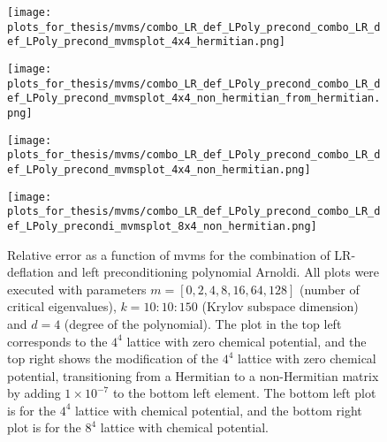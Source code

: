 \begin{figure}[H]
    \centering
    \begin{minipage}{0.45\textwidth}
        \centering
        \texttt{[image: plots\_for\_thesis/mvms/combo\_LR\_def\_LPoly\_precond\_combo\_LR\_def\_LPoly\_precond\_mvmsplot\_4x4\_hermitian.png]} %
    \end{minipage}%
    \hspace{0.02\textwidth} %
    \begin{minipage}{0.45\textwidth}
        \centering
        \texttt{[image: plots\_for\_thesis/mvms/combo\_LR\_def\_LPoly\_precond\_combo\_LR\_def\_LPoly\_precond\_mvmsplot\_4x4\_non\_hermitian\_from\_hermitian.png]} %
    \end{minipage}
    
    \vspace{0.02\textwidth} %
    
    \begin{minipage}{0.45\textwidth}
        \centering
        \texttt{[image: plots\_for\_thesis/mvms/combo\_LR\_def\_LPoly\_precond\_combo\_LR\_def\_LPoly\_precond\_mvmsplot\_4x4\_non\_hermitian.png]} %
    \end{minipage}%
    \hspace{0.02\textwidth} %
    \begin{minipage}{0.45\textwidth}
        \centering
        \texttt{[image: plots\_for\_thesis/mvms/combo\_LR\_def\_LPoly\_precond\_combo\_LR\_def\_LPoly\_precondi\_mvmsplot\_8x4\_non\_hermitian.png]} %
    \end{minipage}
    
    \caption{\small Relative error as a function of mvms for the combination of LR-deflation and left preconditioning polynomial Arnoldi. All plots were executed with parameters $m = [0, 2, 4, 8, 16, 64, 128]$ (number of critical eigenvalues), $k = 10:10:150$ (Krylov subspace dimension) and $d = 4$ (degree of the polynomial). The plot in the top left corresponds to the $4^4$ lattice with zero chemical potential, and the top right shows the modification of the $4^4$ lattice with zero chemical potential, transitioning from a Hermitian to a non-Hermitian matrix by adding $1 \times 10^{-7}$ to the bottom left element. The bottom left plot is for the $4^4$ lattice with chemical potential, and the bottom right plot is for the $8^4$ lattice with chemical potential.}
    \label{fig:combo_LR+left_pre_cond_mvms_plot}
\end{figure}

